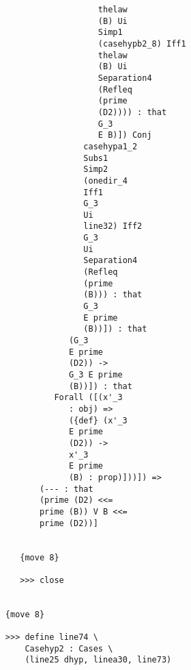 \documentclass[12pt]{article}
\begin{document}
\begin{verbatim}
                                           thelaw 
                                           (B) Ui 
                                           Simp1 
                                           (casehypb2_8) Iff1 
                                           thelaw 
                                           (B) Ui 
                                           Separation4 
                                           (Refleq 
                                           (prime 
                                           (D2)))) : that 
                                           G_3 
                                           E B)]) Conj 
                                        casehypa1_2 
                                        Subs1 
                                        Simp2 
                                        (onedir_4 
                                        Iff1 
                                        G_3 
                                        Ui 
                                        line32) Iff2 
                                        G_3 
                                        Ui 
                                        Separation4 
                                        (Refleq 
                                        (prime 
                                        (B))) : that 
                                        G_3 
                                        E prime 
                                        (B))]) : that 
                                     (G_3 
                                     E prime 
                                     (D2)) -> 
                                     G_3 E prime 
                                     (B))]) : that 
                                  Forall ([(x'_3 
                                     : obj) => 
                                     ({def} (x'_3 
                                     E prime 
                                     (D2)) -> 
                                     x'_3 
                                     E prime 
                                     (B) : prop)]))]) => 
                               (--- : that 
                               (prime (D2) <<= 
                               prime (B)) V B <<= 
                               prime (D2))]


                           {move 8}

                           >>> close


                        {move 8}

                        >>> define line74 \
                            Casehyp2 : Cases \
                            (line25 dhyp, linea30, line73)



\end{verbatim}
\end{document}
